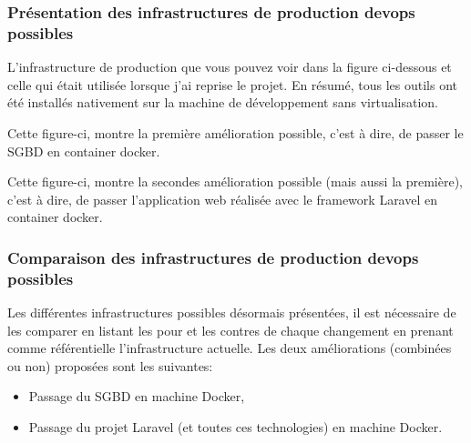 \documentclass[
    iai, %
    il, %
]{heig-tb}
\begin{document}
\subsubsection{Présentation des infrastructures de production \Gls{devops} possibles}
L'infrastructure de production que vous pouvez voir dans la figure ci-dessous et celle qui était utilisée lorsque j'ai reprise le projet.
En résumé, tous les outils ont été installés nativement sur la machine de développement sans virtualisation.

Cette figure-ci, montre la première amélioration possible, c'est à dire, de passer le SGBD en container docker.

Cette figure-ci, montre la secondes amélioration possible (mais aussi la première), c'est à dire, de passer l'application web réalisée avec le framework Laravel en container docker.

\subsubsection{Comparaison des infrastructures de production \Gls{devops} possibles}
Les différentes infrastructures possibles désormais présentées, il est nécessaire de les comparer en listant les pour et les contres de chaque changement en prenant comme référentielle l'infrastructure actuelle.
Les deux améliorations (combinées ou non) proposées sont les suivantes:
\begin{itemize}
    \item Passage du SGBD en machine Docker,
    \item Passage du projet Laravel (et toutes ces technologies) en machine Docker.
\end{itemize}

\end{document}
